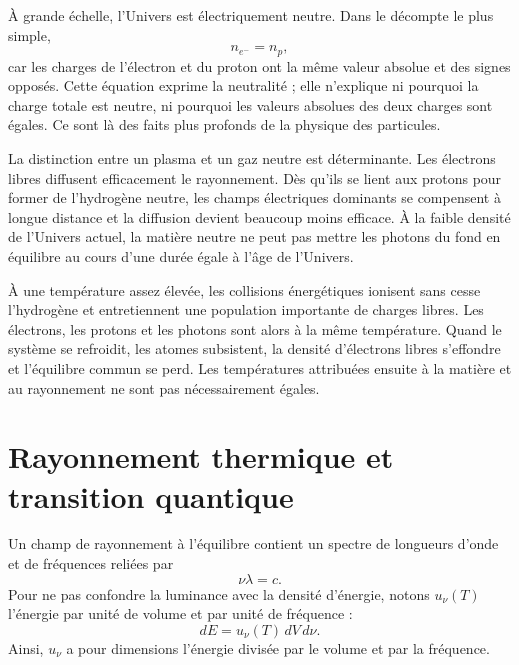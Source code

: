 À grande échelle, l’Univers est électriquement neutre. Dans le décompte le plus simple,
\begin{equation}
n_{e^-}=n_p,
\label{eq:c07-neutrality}
\end{equation}
car les charges de l’électron et du proton ont la même valeur absolue et des signes opposés. Cette équation exprime la neutralité ; elle n’explique ni pourquoi la charge totale est neutre, ni pourquoi les valeurs absolues des deux charges sont égales. Ce sont là des faits plus profonds de la physique des particules.

La distinction entre un plasma et un gaz neutre est déterminante. Les électrons libres diffusent efficacement le rayonnement. Dès qu’ils se lient aux protons pour former de l’hydrogène neutre, les champs électriques dominants se compensent à longue distance et la diffusion devient beaucoup moins efficace. À la faible densité de l’Univers actuel, la matière neutre ne peut pas mettre les photons du fond en équilibre au cours d’une durée égale à l’âge de l’Univers.

À une température assez élevée, les collisions énergétiques ionisent sans cesse l’hydrogène et entretiennent une population importante de charges libres. Les électrons, les protons et les photons sont alors à la même température. Quand le système se refroidit, les atomes subsistent, la densité d’électrons libres s’effondre et l’équilibre commun se perd. Les températures attribuées ensuite à la matière et au rayonnement ne sont pas nécessairement égales.

\begin{classroomqa}
\end{classroomqa}

\section{Rayonnement thermique et transition quantique}

Un champ de rayonnement à l’équilibre contient un spectre de longueurs d’onde et de fréquences reliées par
\begin{equation}
\nu\lambda=c.
\end{equation}
Pour ne pas confondre la luminance avec la densité d’énergie, notons \(u_\nu(T)\) l’énergie par unité de volume et par unité de fréquence :
\begin{equation}
dE=u_\nu(T)\,dV\,d\nu.
\label{eq:c07-spectral-density}
\end{equation}
Ainsi, \(u_\nu\) a pour dimensions l’énergie divisée par le volume et par la fréquence.

